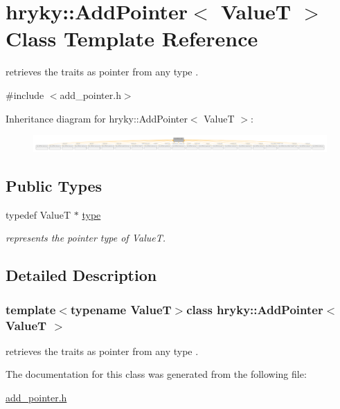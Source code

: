 \hypertarget{classhryky_1_1_add_pointer}{\section{hryky\-:\-:Add\-Pointer$<$ Value\-T $>$ Class Template Reference}
\label{classhryky_1_1_add_pointer}
}


retrieves the traits as pointer from any type .  




{\ttfamily \#include $<$add\-\_\-pointer.\-h$>$}



Inheritance diagram for hryky\-:\-:Add\-Pointer$<$ Value\-T $>$\-:
\nopagebreak
\begin{figure}[H]
\begin{center}
\leavevmode
\includegraphics[width=350pt]{classhryky_1_1_add_pointer__inherit__graph}
\end{center}
\end{figure}
\subsection*{Public Types}
\begin{DoxyCompactItemize}
\item 
\hypertarget{classhryky_1_1_add_pointer_a02d0c31ee76f5cb3f0ba3ca4c01fc8d3}{typedef Value\-T $\ast$ \hyperlink{classhryky_1_1_add_pointer_a02d0c31ee76f5cb3f0ba3ca4c01fc8d3}{type}}\label{classhryky_1_1_add_pointer_a02d0c31ee76f5cb3f0ba3ca4c01fc8d3}

\begin{DoxyCompactList}\small\item\em represents the pointer type of Value\-T. \end{DoxyCompactList}\end{DoxyCompactItemize}


\subsection{Detailed Description}
\subsubsection*{template$<$typename Value\-T$>$class hryky\-::\-Add\-Pointer$<$ Value\-T $>$}

retrieves the traits as pointer from any type . 

The documentation for this class was generated from the following file\-:\begin{DoxyCompactItemize}
\item 
\hyperlink{add__pointer_8h}{add\-\_\-pointer.\-h}\end{DoxyCompactItemize}
